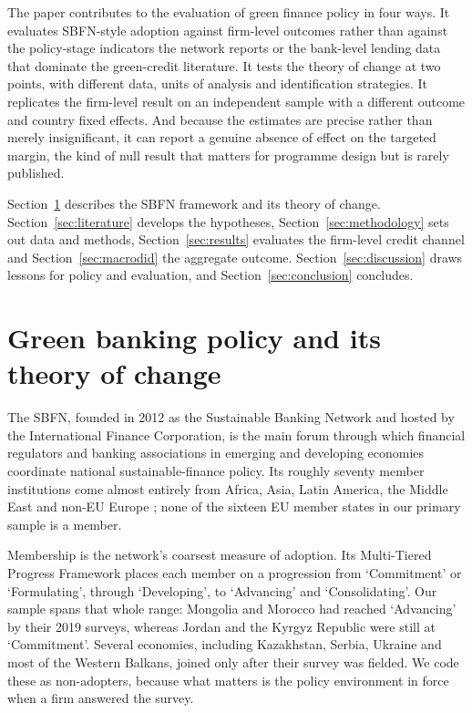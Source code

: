\documentclass[review,authoryear,12pt]{elsarticle}
\begin{document}
The paper contributes to the evaluation of green finance policy in four ways. It evaluates SBFN-style adoption against firm-level outcomes rather than against the policy-stage indicators the network reports or the bank-level lending data that dominate the green-credit literature. It tests the theory of change at two points, with different data, units of analysis and identification strategies. It replicates the firm-level result on an independent sample with a different outcome and country fixed effects. And because the estimates are precise rather than merely insignificant, it can report a genuine absence of effect on the targeted margin, the kind of null result that matters for programme design but is rarely published.

Section~\ref{sec:institutions} describes the SBFN framework and its theory of change. Section~\ref{sec:literature} develops the hypotheses, Section~\ref{sec:methodology} sets out data and methods, Section~\ref{sec:results} evaluates the firm-level credit channel and Section~\ref{sec:macrodid} the aggregate outcome. Section~\ref{sec:discussion} draws lessons for policy and evaluation, and Section~\ref{sec:conclusion} concludes.

\section{Green banking policy and its theory of change}
\label{sec:institutions}

The SBFN, founded in 2012 as the Sustainable Banking Network and hosted by the International Finance Corporation, is the main forum through which financial regulators and banking associations in emerging and developing economies coordinate national sustainable-finance policy. Its roughly seventy member institutions come almost entirely from Africa, Asia, Latin America, the Middle East and non-EU Europe \citep{ifc2025sbfn}; none of the sixteen EU member states in our primary sample is a member.

Membership is the network's coarsest measure of adoption. Its Multi-Tiered Progress Framework places each member on a progression from `Commitment' or `Formulating', through `Developing', to `Advancing' and `Consolidating'. Our sample spans that whole range: Mongolia and Morocco had reached `Advancing' by their 2019 surveys, whereas Jordan and the Kyrgyz Republic were still at `Commitment'. Several economies, including Kazakhstan, Serbia, Ukraine and most of the Western Balkans, joined only after their survey was fielded. We code these as non-adopters, because what matters is the policy environment in force when a firm answered the survey.
\end{document}
